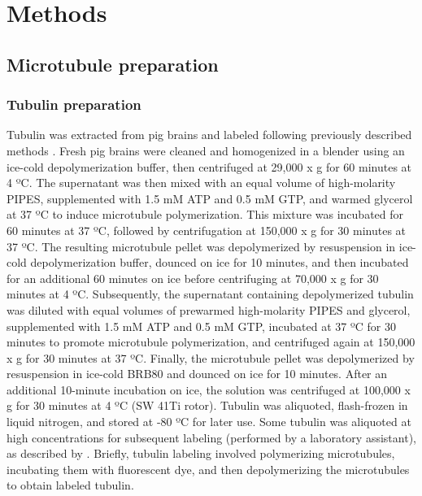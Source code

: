 \chapter{Methods}
\label{methods}

\section{Microtubule preparation}
\subsection{Tubulin preparation}
Tubulin was extracted from pig brains and labeled following previously described methods \parencite{CASTOLDI200383}. Fresh pig brains were cleaned and homogenized in a blender using an ice-cold depolymerization buffer, then centrifuged at 29,000 x g for 60 minutes at 4 ºC. The supernatant was then mixed with an equal volume of high-molarity PIPES, supplemented with 1.5 mM ATP and 0.5 mM GTP, and warmed glycerol at 37 ºC to induce microtubule polymerization. This mixture was incubated for 60 minutes at 37 ºC, followed by centrifugation at 150,000 x g for 30 minutes at 37 ºC. The resulting microtubule pellet was depolymerized by resuspension in ice-cold depolymerization buffer, dounced on ice for 10 minutes, and then incubated for an additional 60 minutes on ice before centrifuging at 70,000 x g for 30 minutes at 4 ºC. Subsequently, the supernatant containing depolymerized tubulin was diluted with equal volumes of prewarmed high-molarity PIPES and glycerol, supplemented with 1.5 mM ATP and 0.5 mM GTP, incubated at 37 ºC for 30 minutes to promote microtubule polymerization, and centrifuged again at 150,000 x g for 30 minutes at 37 ºC. Finally, the microtubule pellet was depolymerized by resuspension in ice-cold BRB80 and dounced on ice for 10 minutes. After an additional 10-minute incubation on ice, the solution was centrifuged at 100,000 x g for 30 minutes at 4 ºC (SW 41Ti rotor). Tubulin was aliquoted, flash-frozen in liquid nitrogen, and stored at -80 ºC for later use. Some tubulin was aliquoted at high concentrations for subsequent labeling (performed by a laboratory assistant), as described by \cite{HYMAN1991478}. Briefly, tubulin labeling involved polymerizing microtubules, incubating them with fluorescent dye, and then depolymerizing the microtubules to obtain labeled tubulin.

